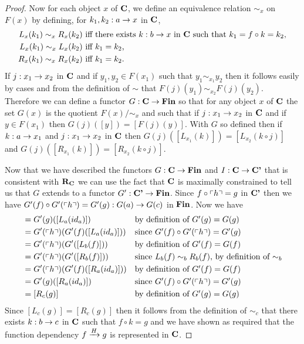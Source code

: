 \begin{proof}
Now for each object $x$ of $\catc$, we define an equivalence relation $\sim_x$ on $F(x)$ by defining,
for $k_1,k_2:a \morph x$ in $\catc$,
\begin{align*}
L_x(k_1) \sim_x R_x(k_2) & \mbox{ iff there exists $k:b \morph x$ in $\catc$ such that $k_1 = f \circ k = k_2$,}\\
L_x(k_1) \sim_x L_x(k_2) & \mbox{ iff $k_1 = k_2$,} \\
R_x(k_1) \sim_x R_x(k_2) & \mbox{ iff $k_1 = k_2$.} \\
\end{align*}
If $j: x_1 \morph x_2$ in $\catc$ and if $y_1,y_2 \in F(x_1)$ such that $y_1 \sim_{x_1} y_2$
then it follows easily by cases and from the definition of $\sim$ that $F(j)(y_1) \sim_{x_2} F(j)(y_2)$.
Therefore we can define a functor 
 $G: \catc \morph \Fin$  so that for any object $x$ of $\catc$
the set $G(x)$ is the quotient $F(x)/{\sim_x}$ and such that 
if $j: x_1 \morph x_2$ in $\catc$ and if $y \in F(x_1)$ then $G(j)([y])=[F(j)(y)]$.
With $G$ so defined then if $k: a \morph x_1$ and $j:x_1 \morph x_2$ in $\catc$
then  $G(j)([L_{x_1}(k)])=[L_{x_2}(k \circ j)]$ and $G(j)([R_{x_1}(k)])=[R_{x_2}(k \circ j)]$. 

Now that we have described the functors  $G: \catc \morph \Fin$ and $I:\catc \morph \catcp$ that is consistent with $\reqtc$
we can use the fact that $\catc$ is maximally constrained to tell us that $G$ extends to a functor 
$G' : \catcp \morph \Fin$. Since $f \circ \qq{h} = g$ in $\catcp$ then we have
 $G'(f) \circ G'(\qq{h}) = G'(g): G(a) \morph G(c)$ in $\Fin$.
Now we have
\begin{align*}
[L_c(g)]&= G'(g)([L_a(id_a)])              & & \mbox{by definition of $G'(g)=G(g)$}           \\
        &= G'(\qq{h}) (G'(f)([L_a(id_a)])) & & \mbox{since $G'(f) \circ G'(\qq{h}) = G'(g)$}  \\
				&= G'(\qq{h}) (G'([L_b(f)]))       & & \mbox{by definition of $G'(f)=G(f)$}           \\
				&= G'(\qq{h}) (G'([R_b(f)]))       & & \mbox{since $L_b(f) \sim_b R_b(f)$, by definition of $\sim_b$} \\
				&= G'(\qq{h}) (G'(f)([R_a(id_a)])) & & \mbox{by definition of $G'(f)=G(f)$}           \\
		    &= G'(g)([R_a(id_a)])              & & \mbox{since $G'(f) \circ G'(\qq{h}) = G'(g)$}  \\
				&= [R_c(g)]                        & & \mbox{by definition of $G'(g)=G(g)$}           \\
\end{align*} 
Since $[L_c(g)]=[R_c(g)]$ then it follows from the definition of $\sim_c$ that there exists $k:b \morph c$ in 
$\catc$ such that $f \circ k = g$ and we have shown as required that the function dependency
$\fundep{H}{f}{g}$ is represented in $\catc$.

\end{proof}

